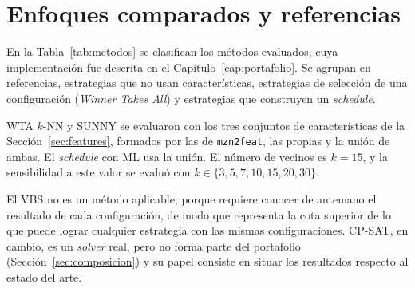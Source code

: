 \section{Enfoques comparados y referencias}
\label{sec:enfoques}

En la Tabla~\ref{tab:metodos} se clasifican los métodos evaluados, cuya
implementación fue descrita en el Capítulo~\ref{cap:portafolio}. Se agrupan en
referencias, estrategias que no usan características, estrategias de selección
de una configuración (\textit{Winner Takes All}) y estrategias que construyen
un \textit{schedule}.

WTA $k$-NN y SUNNY se evaluaron con los tres conjuntos de características de
la Sección~\ref{sec:features}, formados por las de \texttt{mzn2feat}, las
propias y la unión de ambas. El \textit{schedule} con ML usa la unión. El
número de vecinos es $k = 15$, y la sensibilidad a este valor se evaluó con
$k \in \{3, 5, 7, 10, 15, 20, 30\}$.

El VBS no es un método aplicable, porque requiere conocer de antemano el
resultado de cada configuración, de modo que representa la cota superior de lo
que puede lograr cualquier estrategia con las mismas configuraciones. CP-SAT,
en cambio, es un \textit{solver} real, pero no forma parte del portafolio
(Sección~\ref{sec:composicion}) y su papel consiste en situar los resultados
respecto al estado del arte.

